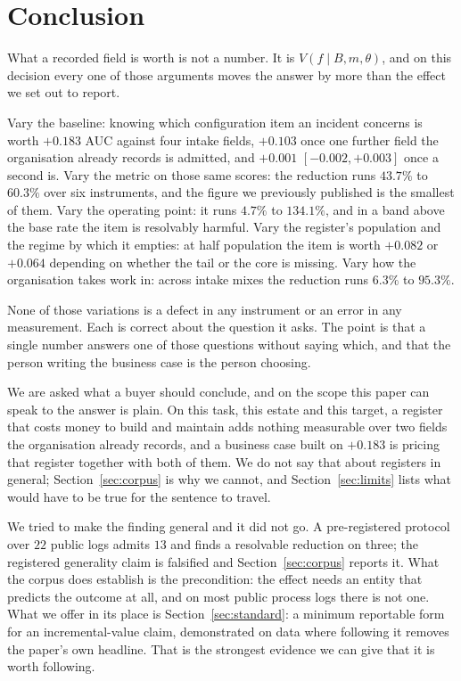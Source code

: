 \documentclass[preprint,12pt]{elsarticle}
\begin{document}
\section{Conclusion}

What a recorded field is worth is not a number. It is
$V(f \mid B, m, \theta)$, and on this decision every one of those arguments
moves the answer by more than the effect we set out to report.

Vary the baseline: knowing which configuration item an incident concerns is
worth $+0.183$ AUC against four intake fields, $+0.103$ once one further field
the organisation already records is admitted, and $+0.001$
$[-0.002,+0.003]$ once a second is. Vary the metric on those same scores: the
reduction runs $43.7\%$ to $60.3\%$ over six instruments, and the figure we
previously published is the smallest of them. Vary the operating point: it
runs $4.7\%$ to $134.1\%$, and in a band above the base rate the item is
resolvably harmful. Vary the register's population and the regime by which it
empties: at half population the item is worth $+0.082$ or $+0.064$ depending
on whether the tail or the core is missing. Vary how the organisation takes
work in: across intake mixes the reduction runs $6.3\%$ to $95.3\%$.

None of those variations is a defect in any instrument or an error in any
measurement. Each is correct about the question it asks. The point is that a
single number answers one of those questions without saying which, and that
the person writing the business case is the person choosing.

We are asked what a buyer should conclude, and on the scope this paper can
speak to the answer is plain. On this task, this estate and this target, a
register that costs money to build and maintain adds nothing measurable over
two fields the organisation already records, and a business case built on
$+0.183$ is pricing that register together with both of them. We do not say
that about registers in general; Section~\ref{sec:corpus} is why we cannot,
and Section~\ref{sec:limits} lists what would have to be true for the sentence
to travel.

We tried to make the finding general and it did not go. A pre-registered
protocol over $22$ public logs admits $13$ and finds a resolvable reduction on
three; the registered generality claim is falsified and Section~\ref{sec:corpus}
reports it. What the corpus does establish is the precondition: the effect
needs an entity that predicts the outcome at all, and on most public process
logs there is not one. What we offer in its place is
Section~\ref{sec:standard}: a minimum reportable form for an incremental-value
claim, demonstrated on data where following it removes the paper's own
headline. That is the strongest evidence we can give that it is worth
following.
\end{document}

